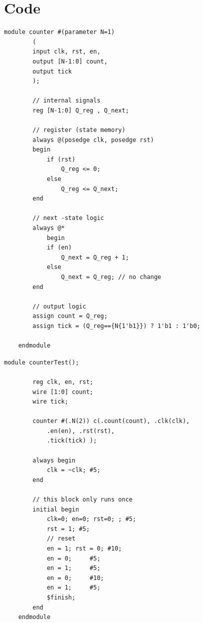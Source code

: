 \documentclass[11pt]{article}
\begin{document}
\clearpage
\section*{Code}

\begin{lstlisting}[style=Verilog,
caption=Counter Source Code,
label=MUX w/ two inputs Source Code
]
	module counter #(parameter N=1) 
		( 
		input clk, rst, en,
		output [N-1:0] count, 
		output tick 
		);
		
		// internal signals
		reg [N-1:0] Q_reg , Q_next;
		
		// register (state memory)
		always @(posedge clk, posedge rst) 
		begin
			if (rst) 
				Q_reg <= 0; 
			else
				Q_reg <= Q_next;
		end
		
		// next -state logic 
		always @* 
			begin 
			if (en) 
				Q_next = Q_reg + 1; 
			else 
				Q_next = Q_reg; // no change 
		end
		
		// output logic 
		assign count = Q_reg; 
		assign tick = (Q_reg=={N{1'b1}}) ? 1'b1 : 1'b0;
	
	endmodule
\end{lstlisting}
\clearpage

\begin{lstlisting}[style=Verilog,
caption=Counter Test,
label=MUX2 Test
]
	module counterTest();
	
		reg clk, en, rst;
		wire [1:0] count;
		wire tick;
		
		counter #(.N(2)) c(.count(count), .clk(clk),
			.en(en), .rst(rst),
			.tick(tick) );
	
		always begin 
			clk = ~clk; #5; 
		end
		
		// this block only runs once
		initial begin
			clk=0; en=0; rst=0; ; #5;
			rst = 1; #5;
			// reset
			en = 1; rst = 0; #10;
			en = 0;     #5;
			en = 1;     #5;
			en = 0;     #10;
			en = 1;     #5;
			$finish;
		end 
	endmodule
\end{lstlisting}
\end{document}
